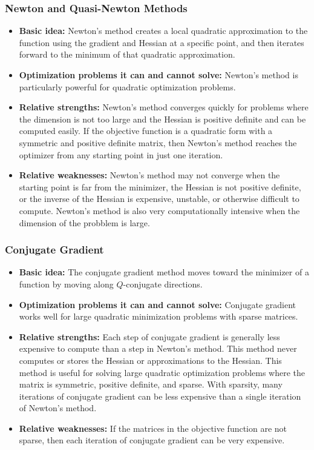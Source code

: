 \documentclass[letterpaper,12pt]{article}
\theoremstyle{definition}
\begin{document}
\subsubsection*{Newton and Quasi-Newton Methods}
\begin{itemize}
\item \textbf{Basic idea:} Newton's method creates a local quadratic approximation to the function using the gradient and Hessian at a specific point, and then iterates forward to the minimum of that quadratic approximation. 
\item \textbf{Optimization problems it can and cannot solve:} Newton's method is particularly powerful for quadratic optimization problems. 
\item \textbf{Relative strengths:} Newton's method converges quickly for problems where the dimension is not too large and the Hessian is positive definite and can be computed easily. If the objective function is a quadratic form with a symmetric and positive definite matrix, then Newton's method reaches the optimizer from any starting point in just one iteration. 
\item \textbf{Relative weaknesses:} Newton's method may not converge when the starting point is far from the minimizer, the Hessian is not positive definite, or the inverse of the Hessian is expensive, unstable, or otherwise difficult to compute. Newton's method is also very computationally intensive when the dimension of the probblem is large. 
\end{itemize}

\subsubsection*{Conjugate Gradient}
\begin{itemize}
\item \textbf{Basic idea:} The conjugate gradient method moves toward the minimizer of a function by moving along $Q$-conjugate directions. 
\item \textbf{Optimization problems it can and cannot solve:} Conjugate gradient works well for large quadratic minimization problems with sparse matrices. 
\item \textbf{Relative strengths:} Each step of conjugate gradient is generally less expensive to compute than a step in Newton's method. This method never computes or stores the Hessian or approximations to the Hessian. This method is useful for solving large quadratic optimization problems where the matrix is symmetric, positive definite, and sparse. With sparsity, many iterations of conjugate gradient can be less expensive than a single iteration of Newton's method.
\item \textbf{Relative weaknesses:} If the matrices in the objective function are not sparse, then each iteration of conjugate gradient can be very expensive. 
\end{itemize}
\end{document}
